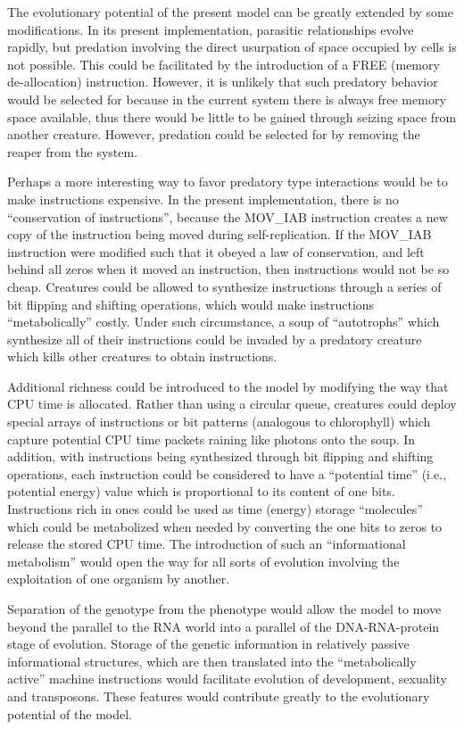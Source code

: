 The evolutionary potential of the present model can be greatly extended by
some modifications.  In its present implementation, parasitic relationships
evolve rapidly, but predation involving the direct usurpation of space
occupied by cells is not possible.  This could be facilitated by the
introduction of a FREE (memory de-allocation) instruction.  However, it is
unlikely that such predatory behavior would be selected for because in the
current system there is always free memory space available, thus there would
be little to be gained through seizing space from another creature.  However,
predation could be selected for by removing the reaper from the system.

Perhaps a more interesting way to favor predatory type interactions would be
to make instructions expensive.  In the present implementation, there is
no ``conservation of instructions'', because the MOV\_IAB instruction creates
a new copy of the instruction being moved during self-replication.  If the
MOV\_IAB instruction were modified such that it obeyed a law of conservation,
and left behind all zeros when it moved an instruction, then instructions
would not be so cheap.  Creatures could be allowed to synthesize instructions
through a series of bit flipping and shifting operations, which would make
instructions ``metabolically'' costly.  Under such circumstance, a soup of
``autotrophs'' which synthesize all of their instructions could be invaded by
a predatory creature which kills other creatures to obtain instructions.

Additional richness could be introduced to the model by modifying the way
that CPU time is allocated.  Rather than using a circular queue, creatures
could deploy special arrays of instructions or bit patterns (analogous to
chlorophyll) which capture potential CPU time packets raining like photons
onto the soup.  In addition, with instructions being synthesized through bit
flipping and shifting operations, each instruction could be considered to
have a ``potential time'' (i.e., potential energy) value which is proportional
to its content of one bits.  Instructions rich in ones could be used as time
(energy) storage ``molecules'' which could be metabolized when needed by
converting the one bits to zeros to release the stored CPU time.  The
introduction of such an ``informational metabolism'' would open the way
for all sorts of evolution involving the exploitation of one organism by
another.

Separation of the genotype from the phenotype would allow the model to
move beyond the parallel to the RNA world into a parallel of the
DNA-RNA-protein stage of evolution.  Storage of the genetic information
in relatively passive informational structures, which are then translated
into the ``metabolically active'' machine instructions would facilitate
evolution of development, sexuality and transposons.  These features would
contribute greatly to the evolutionary potential of the model.

